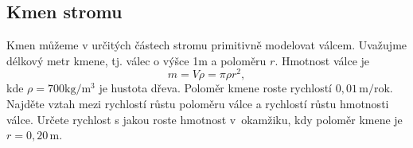 \subsection{Kmen stromu}
  Kmen můžeme v určitých
částech stromu primitivně modelovat
válcem. Uvažujme délkový metr kmene,
tj. válec o výšce 1m a poloměru
$r$. Hmotnost válce je
\begin{equation*}
m=V\rho =\pi \rho
r^2,
\end{equation*}
kde $\rho=700 \mathrm{kg/m^3}$ je hustota
dřeva. Poloměr kmene roste rychlostí
$0{,}01\,\mathrm{m/rok}$. Najděte vztah
mezi rychlostí růstu poloměru válce a
rychlostí růstu hmotnosti válce. Určete
rychlost s jakou roste hmotnost
v~okamžiku, kdy poloměr kmene je
$r=0{,}20\,\mathrm{m}$.
